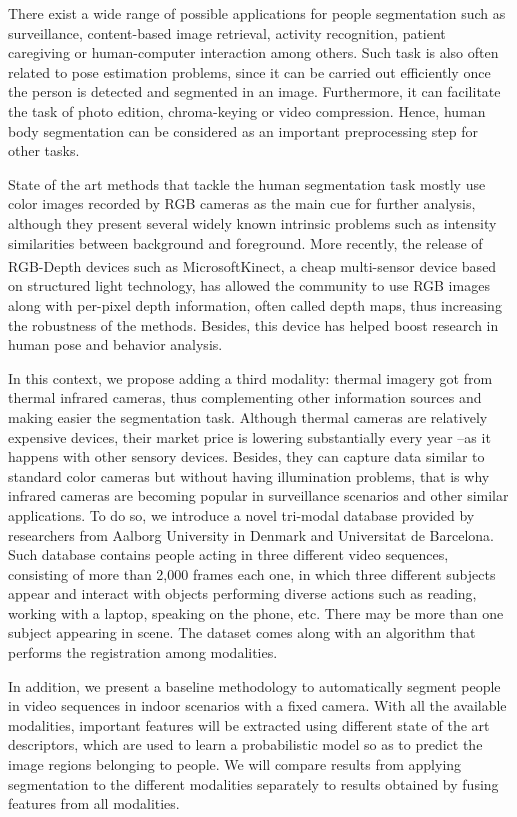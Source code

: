 \documentclass[10pt,twocolumn,letterpaper]{article}
\begin{document}
There exist a wide range of possible applications for people segmentation such as surveillance, content-based image retrieval, activity recognition, patient caregiving or human-computer interaction among others. Such task is also often related to pose estimation problems, since it can be carried out efficiently once the person is detected and segmented in an image. Furthermore, it can facilitate the task of photo edition, chroma-keying or video compression. Hence, human body segmentation can be considered as an important preprocessing step for other tasks.

State of the art methods that tackle the human segmentation task mostly use color images recorded by RGB cameras as the main cue for further analysis, although they present several widely known intrinsic problems such as intensity similarities between background and foreground. More recently, the release of RGB-Depth devices such as Microsoft\textsuperscript\textregistered Kinect\textsuperscript\texttrademark , a cheap multi-sensor device based on structured light technology, has allowed the community to use RGB images along with per-pixel depth information, often called depth maps, thus increasing the robustness of the methods. Besides, this device has helped boost research in human pose and behavior analysis.

In this context, we propose adding a third modality: thermal imagery got from thermal infrared cameras, thus complementing other information sources and making easier the segmentation task. Although thermal cameras are relatively expensive devices, their market price is lowering substantially every year --as it happens with other sensory devices. Besides, they can capture data similar to standard color cameras but without having illumination problems, that is why infrared cameras are becoming popular in surveillance scenarios and other similar applications. To do so, we introduce a novel tri-modal database provided by researchers from Aalborg University in Denmark and Universitat de Barcelona. Such database contains people acting in three different video sequences, consisting of more than 2,000 frames each one, in which three different subjects appear and interact with objects performing diverse actions such as reading, working with a laptop, speaking on the phone, etc. There may be more than one subject appearing in scene. The dataset comes along with an algorithm that performs the registration among modalities. 

In addition, we present a baseline methodology to automatically segment people in video sequences in indoor scenarios with a fixed camera. With all the available modalities, important features will be extracted using different state of the art descriptors, which are used to learn a probabilistic model so as to predict the image regions belonging to people. We will compare results from applying segmentation to the different modalities separately to results obtained by fusing features from all modalities.
\end{document}
